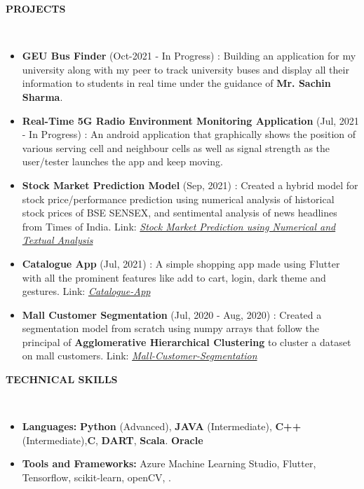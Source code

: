 \documentclass[a4paper,10pt]{article}
\newcommand{\lsep}{-0.5cm}
\newcommand{\resheading}[1]{{\small \colorbox{mygrey}{\begin{minipage}{0.975\textwidth}{\textbf{#1 \vphantom{p\^{E}}}}\end{minipage}}}}
\begin{document}
\resheading{\textbf{PROJECTS} }\\[\lsep]
\begin{itemize}
\setlength\itemsep{0.5em}

\item \textbf{GEU Bus Finder} (Oct-2021 - In Progress) : Building an application for my university along with my peer to track university buses and display all their information to students in real time under the guidance of \textbf{Mr. Sachin Sharma}.

\item \textbf{Real-Time 5G Radio Environment Monitoring Application} (Jul, 2021 - In Progress) : An android application that graphically shows the position of various serving cell and neighbour cells as well as signal strength as the user/tester launches the app and keep moving.

\item \textbf{Stock Market Prediction Model} (Sep, 2021) : Created a hybrid model for stock price/performance prediction using numerical analysis of historical stock prices of BSE SENSEX, and sentimental analysis of news headlines from Times of India. Link: \href{https://github.com/Ash20vyas/TSF-Intern-Tasks/tree/main/%232%20-%20Stock%20Market%20Prediction%20using%20Numerical%20and%20Textual%20Analysis} {\textit{Stock Market Prediction using Numerical and Textual Analysis}}

\item \textbf{Catalogue App} (Jul, 2021) : A simple shopping app made using Flutter with all the prominent features like add to cart, login, dark theme and gestures. Link: \href{https://github.com/Ash20vyas/catalogue_app} {\textit{Catalogue-App}}

\item \textbf{Mall Customer Segmentation} (Jul, 2020 - Aug, 2020) : Created a segmentation model from scratch using numpy arrays that follow the principal of \textbf{Agglomerative Hierarchical Clustering} to cluster a dataset on mall customers. Link: \href{https://github.com/Ash20vyas/Mall-Customer-Segmentation} {\textit{Mall-Customer-Segmentation}}

\end{itemize}

\resheading{\textbf{TECHNICAL SKILLS} }\\[\lsep]
\begin{itemize}
\setlength\itemsep{0em}
\item \noindent \textbf{Languages:} \textbf{Python} (Advanced), \textbf{JAVA} (Intermediate), \textbf{C++} (Intermediate),\textbf{C},  \textbf{DART}, \textbf{Scala}. \textbf{Oracle} \\
\item \noindent\textbf{Tools and Frameworks:} Azure Machine Learning Studio, Flutter, Tensorflow, scikit-learn, openCV, .\\
\end{itemize}
\end{document}
